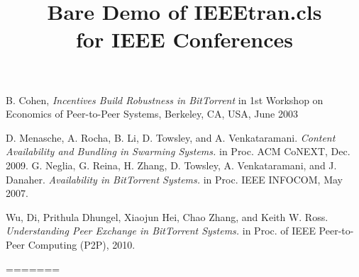 \documentclass[conference]{IEEEtran}
\begin{document}
	\begin{thebibliography}{10}
		
		B. Cohen, \emph{Incentives Build Robustness in BitTorrent} in 1st Workshop
		on Economics of Peer-to-Peer Systems, Berkeley, CA, USA, June 2003
		
		D. Menasche, A. Rocha, B. Li, D. Towsley, and A. Venkataramani.  \emph{Content Availability and Bundling in Swarming Systems.} in Proc. ACM CoNEXT, Dec. 2009.
		G. Neglia, G. Reina, H. Zhang, D. Towsley, A. Venkataramani, and J. Danaher. \emph{Availability in BitTorrent Systems.} in Proc. IEEE INFOCOM, May 2007.
		
		Wu, Di, Prithula Dhungel, Xiaojun Hei, Chao Zhang, and Keith W. Ross. \emph{Understanding Peer Exchange in BitTorrent Systems.} in Proc. of IEEE Peer-to-Peer Computing (P2P), 2010.
		
	\end{thebibliography}
	
	
	
	
=======
%
\title{Bare Demo of IEEEtran.cls\\ for IEEE Conferences}


\author{
\and
{}
}
\end{document}
